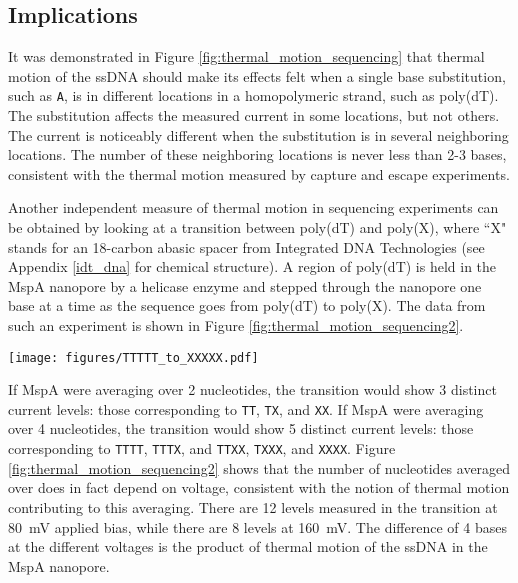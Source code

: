 \subsection{Implications}

It was demonstrated in Figure \ref{fig:thermal_motion_sequencing} that thermal motion of the ssDNA should make its effects felt when a single base substitution, such as \texttt{A}, is in different locations in a homopolymeric strand, such as poly(dT).  The substitution affects the measured current in some locations, but not others.  The current is noticeably different when the substitution is in several neighboring locations.  The number of these neighboring locations is never less than 2-3 bases, consistent with the thermal motion measured by capture and escape experiments.

Another independent measure of thermal motion in sequencing experiments can be obtained by looking at a transition between poly(dT) and poly(X), where ``X" stands for an 18-carbon abasic spacer from Integrated DNA Technologies (see Appendix \ref{idt_dna} for chemical structure).  A region of poly(dT) is held in the MspA nanopore by a helicase enzyme and stepped through the nanopore one base at a time as the sequence goes from poly(dT) to poly(X).  The data from such an experiment is shown in Figure \ref{fig:thermal_motion_sequencing2}.

\begin{sidewaysfigure}[h]
\begin{centering}
\texttt{[image: figures/TTTTT\_to\_XXXXX.pdf]}
\caption[Thermal motion averaging with voltage]{Traces of current recorded as ssDNA steps through MspA nanopore base by base from poly(dT) to poly(X), where X is an 18-carbon abasic spacer.  The number of current levels in this transition reveals the number of bases that contribute to the current signal.  This number depends on voltage, as expected from thermal motion.  Initial current levels are poly(dT), and the last current levels are poly(X).  Current shows a sharp transition at each step of the ssDNA, by one base, through the MspA nanopore.}
\label{fig:thermal_motion_sequencing2}
\end{centering}
\end{sidewaysfigure}

If MspA were averaging over 2 nucleotides, the transition would show 3 distinct current levels: those corresponding to \texttt{TT}, \texttt{TX}, and \texttt{XX}.  If MspA were averaging over 4 nucleotides, the transition would show 5 distinct current levels: those corresponding to \texttt{TTTT}, \texttt{TTTX}, and \texttt{TTXX}, \texttt{TXXX}, and \texttt{XXXX}.  Figure \ref{fig:thermal_motion_sequencing2} shows that the number of nucleotides averaged over does in fact depend on voltage, consistent with the notion of thermal motion contributing to this averaging.  There are 12 levels measured in the transition at \SI{80}{\mV} applied bias, while there are 8 levels at \SI{160}{\mV}.  The difference of 4 bases at the different voltages is the product of thermal motion of the ssDNA in the MspA nanopore.
